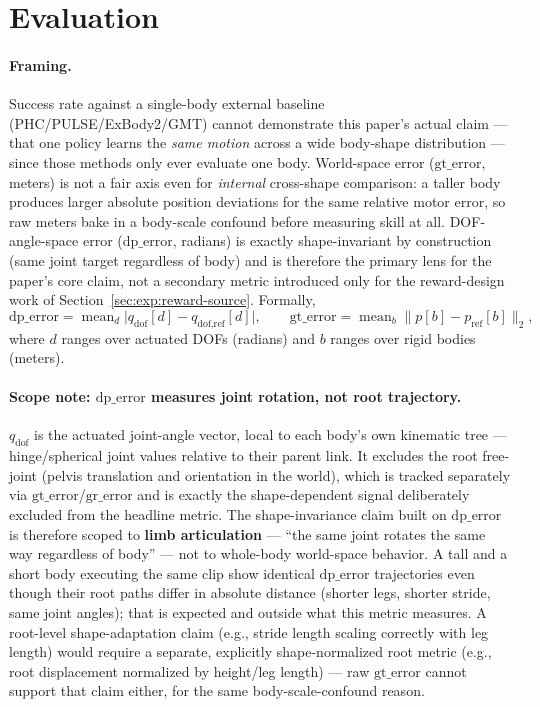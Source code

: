 \section{Evaluation}
\label{sec:evaluation}

\paragraph{Framing.} Success rate against a single-body external baseline (PHC/PULSE/ExBody2/GMT)
cannot demonstrate this paper's actual claim — that one policy learns the \emph{same motion}
across a wide body-shape distribution — since those methods only ever evaluate one body.
World-space error ($\mathrm{gt\_error}$, meters) is not a fair axis even for \emph{internal}
cross-shape comparison: a taller body produces larger absolute position deviations for the same
relative motor error, so raw meters bake in a body-scale confound before measuring skill at all.
DOF-angle-space error ($\mathrm{dp\_error}$, radians) is exactly shape-invariant by construction
(same joint target regardless of body) and is therefore the primary lens for the paper's core
claim, not a secondary metric introduced only for the reward-design work of
Section~\ref{sec:exp:reward-source}. Formally,
\begin{equation}
  \mathrm{dp\_error} = \operatorname{mean}_{d}\big| q_{\text{dof}}[d] - q_{\text{dof,ref}}[d] \big|,
  \qquad
  \mathrm{gt\_error} = \operatorname{mean}_{b}\big\| p[b] - p_{\text{ref}}[b] \big\|_2,
  \label{eq:dp-gt-error}
\end{equation}
where $d$ ranges over actuated DOFs (radians) and $b$ ranges over rigid bodies (meters).

\paragraph{Scope note: $\mathrm{dp\_error}$ measures joint rotation, not root trajectory.}
$q_{\text{dof}}$ is the actuated joint-angle vector, local to each body's own kinematic tree —
hinge/spherical joint values relative to their parent link. It excludes the root free-joint
(pelvis translation and orientation in the world), which is tracked separately via
$\mathrm{gt\_error}$/$\mathrm{gr\_error}$ and is exactly the shape-dependent signal deliberately
excluded from the headline metric. The shape-invariance claim built on $\mathrm{dp\_error}$ is
therefore scoped to \textbf{limb articulation} — ``the same joint rotates the same way regardless
of body'' — not to whole-body world-space behavior. A tall and a short body executing the same
clip show identical $\mathrm{dp\_error}$ trajectories even though their root paths differ in
absolute distance (shorter legs, shorter stride, same joint angles); that is expected and outside
what this metric measures. A root-level shape-adaptation claim (e.g., stride length scaling
correctly with leg length) would require a separate, explicitly shape-normalized root metric
(e.g., root displacement normalized by height/leg length) — raw $\mathrm{gt\_error}$ cannot
support that claim either, for the same body-scale-confound reason.

